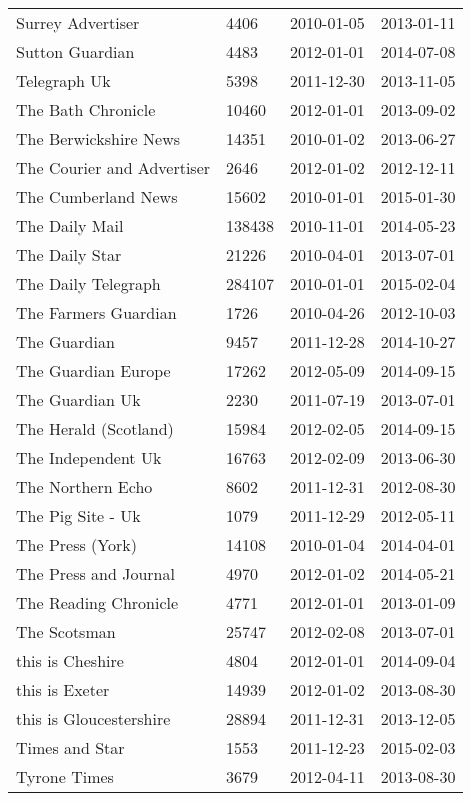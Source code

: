\begin{longtable}{p{}p{}p{}p{}}
  Surrey Advertiser & 4406 & 2010-01-05 & 2013-01-11 \\ 
  Sutton Guardian & 4483 & 2012-01-01 & 2014-07-08 \\ 
  Telegraph Uk & 5398 & 2011-12-30 & 2013-11-05 \\ 
  The Bath Chronicle & 10460 & 2012-01-01 & 2013-09-02 \\ 
  The Berwickshire News & 14351 & 2010-01-02 & 2013-06-27 \\ 
  The Courier and Advertiser & 2646 & 2012-01-02 & 2012-12-11 \\ 
  The Cumberland News & 15602 & 2010-01-01 & 2015-01-30 \\ 
  The Daily Mail & 138438 & 2010-11-01 & 2014-05-23 \\ 
  The Daily Star & 21226 & 2010-04-01 & 2013-07-01 \\ 
  The Daily Telegraph & 284107 & 2010-01-01 & 2015-02-04 \\ 
  The Farmers Guardian & 1726 & 2010-04-26 & 2012-10-03 \\ 
  The Guardian & 9457 & 2011-12-28 & 2014-10-27 \\ 
  The Guardian Europe & 17262 & 2012-05-09 & 2014-09-15 \\ 
  The Guardian Uk & 2230 & 2011-07-19 & 2013-07-01 \\ 
  The Herald (Scotland) & 15984 & 2012-02-05 & 2014-09-15 \\ 
  The Independent Uk & 16763 & 2012-02-09 & 2013-06-30 \\ 
  The Northern Echo & 8602 & 2011-12-31 & 2012-08-30 \\ 
  The Pig Site - Uk & 1079 & 2011-12-29 & 2012-05-11 \\ 
  The Press (York) & 14108 & 2010-01-04 & 2014-04-01 \\ 
  The Press and Journal & 4970 & 2012-01-02 & 2014-05-21 \\ 
  The Reading Chronicle & 4771 & 2012-01-01 & 2013-01-09 \\ 
  The Scotsman & 25747 & 2012-02-08 & 2013-07-01 \\ 
  this is Cheshire & 4804 & 2012-01-01 & 2014-09-04 \\ 
  this is Exeter & 14939 & 2012-01-02 & 2013-08-30 \\ 
  this is Gloucestershire & 28894 & 2011-12-31 & 2013-12-05 \\ 
  Times and Star & 1553 & 2011-12-23 & 2015-02-03 \\ 
  Tyrone Times & 3679 & 2012-04-11 & 2013-08-30 \\ 

\end{longtable}
